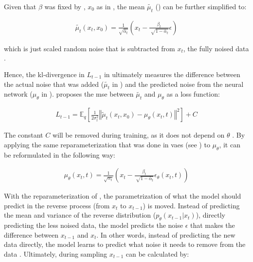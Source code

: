 \noindent Given that $\beta$ was fixed by \textcite{ho2020DenoisingDiffusionProbabilistic}, $x_0$ as in , the mean $\tilde{\mu_t}$ () can be further simplified to:

\begin{equation}
  \begin{align}
    \label{eqn:lt-1_3}
    \tilde{\mu_t}(x_t, x_0) = \frac{1}{\sqrt{\bar{\alpha}_t}}(x_t - \frac{\beta_t}{\sqrt[]{1-\bar{\alpha}_t}}\epsilon)
  \end{align}
\end{equation}

\noindent which is just scaled random noise that is subtracted from $x_t$, the fully noised data \cite{ho2020DenoisingDiffusionProbabilistic}.

Hence, the \gls{kl}-divergence in $L_{t-1}$ in  ultimately measures the difference between the actual noise that was added ($\tilde{\mu_t}$ in ) and the predicted noise from the neural network ($\mu_\theta$ in ).
\textcite{ho2020DenoisingDiffusionProbabilistic} proposes the \gls{mse} between $\tilde{\mu_t}$ and $\mu_\theta$ as a loss function:

\begin{equation}
  \begin{align}
    \label{eqn:mse_loss}
    L_{t-1} = \mathbb{E}_q \left[ \frac{1}{2\sigma_t^2} \left\Vert \tilde{\mu}_t(x_t, x_0) - \mu_\theta(x_t, t) \right\Vert^2 \right] + C
  \end{align}
\end{equation}

\noindent The constant $C$ will be removed during training, as it does not depend on $\theta$ \cite{ho2020DenoisingDiffusionProbabilistic}.
By applying the same reparameterization that was done in \glspl{vae} (see ) to $\mu_\theta$, it can be reformulated in the following way:

\begin{equation}
  \begin{align}
    \label{eqn:mse_loss_2}
    \mu_\theta(x_t,t)= \frac{1}{\sqrt{\alpha_t}}(x_t - \frac{\beta_t}{\sqrt[]{1-\bar{\alpha}_t}}\epsilon_\theta(x_t,t)) 
  \end{align}
\end{equation}

With the reparameterization of , the parametrization of what the \gls{model} should predict in the reverse process (from $x_t$ to $x_{t-1}$) is moved. 
Instead of predicting the mean and variance of the reverse distribution ($p_\theta(x_{t-1}|x_t)$), \ie directly predicting the less noised data, 
the \gls{model} predicts the noise $\epsilon$ that makes the difference between $x_{t-1}$ and ${x_t}$.
In other words, instead of predicting the new data directly, the \gls{model} learns to predict what noise it needs to remove from the data \cite{capel2022MasterThesisDenoising}.
Ultimately, during sampling $x_{t-1}$ can be calculated by:

